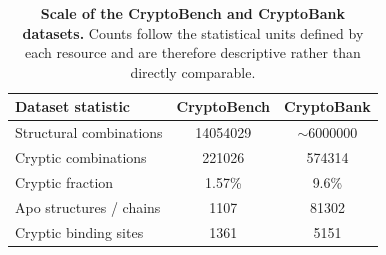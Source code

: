 \begin{table}[t]
\centering
\caption{\textbf{Scale of the CryptoBench and CryptoBank datasets.}
Counts follow the statistical units defined by each resource and are therefore
descriptive rather than directly comparable.}
\label{tab:dataset_scale}

\small
\setlength{\tabcolsep}{6pt}
\renewcommand{\arraystretch}{1.15}

\begin{tabular}{@{}lcc@{}}
\toprule
\textbf{Dataset statistic} & \textbf{CryptoBench} & \textbf{CryptoBank} \\
\midrule
Structural combinations & \num{14054029} & $\sim$\num{6000000} \\
Cryptic combinations & \num{221026} & \num{574314} \\
Cryptic fraction & 1.57\% & 9.6\% \\
Apo structures / chains & \num{1107} & \num{81302} \\
Cryptic binding sites & \num{1361} & \num{5151} \\
\bottomrule
\end{tabular}
\end{table}
